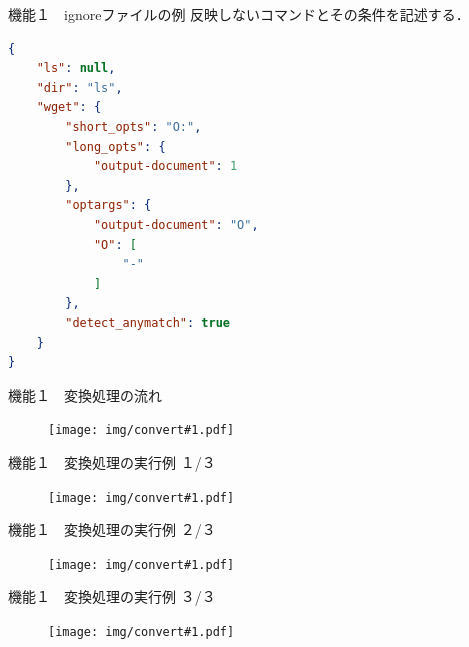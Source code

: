 \begin{frame}[fragile]{機能１　ignoreファイルの例}
    反映しないコマンドとその条件を記述する．
\begin{lstlisting}[language=json]
{
    "ls": null,
    "dir": "ls",
    "wget": {
        "short_opts": "O:",
        "long_opts": {
            "output-document": 1
        },
        "optargs": {
            "output-document": "O",
            "O": [
                "-"
            ]
        },
        "detect_anymatch": true
    }
}
\end{lstlisting}

\end{frame}




\newcommand{\MyConvertExample}[2]{
    \begin{frame}{機能１　変換処理の#2}
        \begin{figure}
            \centering
            \texttt{[image: img/convert\#1.pdf]}
        \end{figure}
    \end{frame}
}

\MyConvertExample{1}{流れ}
\MyConvertExample{2}{実行例 １/３}
\MyConvertExample{3}{実行例 ２/３}
\MyConvertExample{4}{実行例 ３/３}




